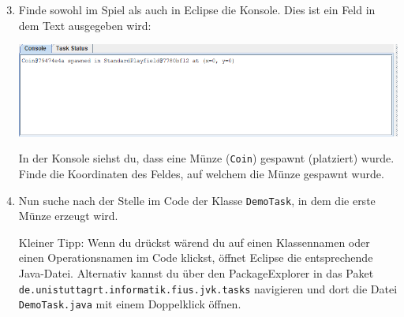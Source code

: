\begin{enumerate}\setcounter{enumi}{2}

    \item Finde sowohl im Spiel als auch in Eclipse die Konsole. Dies ist ein Feld in dem Text ausgegeben wird:
    \begin{center}
        \includegraphics[width=\linewidth]{./figures/console.PNG}
    \end{center}

    In der Konsole siehst du, dass eine Münze (\texttt{Coin}) gespawnt (platziert) wurde. 
    Finde die Koordinaten des Feldes, auf welchem die Münze gespawnt wurde.

    \item Nun suche nach der Stelle im Code der Klasse \lstinline{DemoTask}, in dem die erste Münze erzeugt wird.
    
        Kleiner Tipp: 
        Wenn du  drückst wärend du auf einen Klassennamen oder einen Operationsnamen im Code klickst, öffnet Eclipse die entsprechende Java-Datei.
        Alternativ kannst du über den PackageExplorer in das Paket \texttt{de.unistuttagrt.informatik.fius.jvk.tasks} navigieren und dort die Datei \texttt{DemoTask.java} mit einem Doppelklick öffnen.
\end{enumerate}
